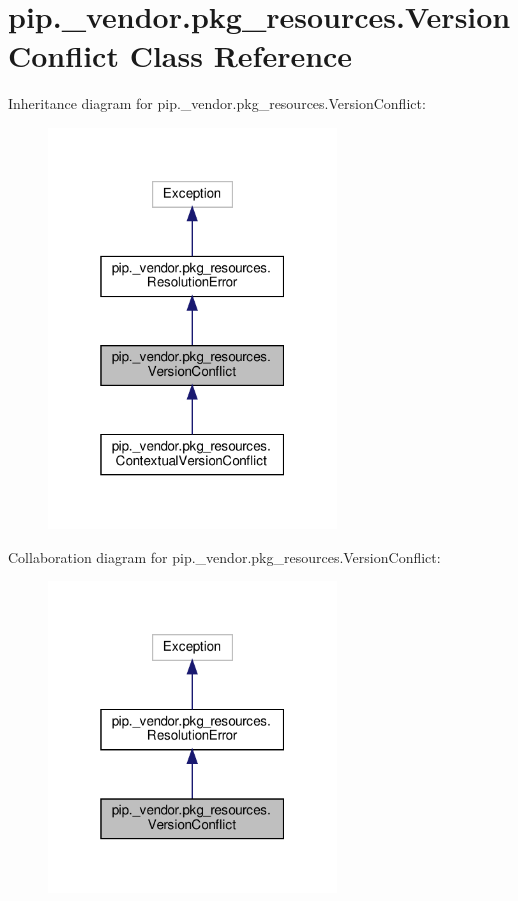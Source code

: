 \hypertarget{classpip_1_1__vendor_1_1pkg__resources_1_1VersionConflict}{}\section{pip.\+\_\+vendor.\+pkg\+\_\+resources.\+Version\+Conflict Class Reference}
\label{classpip_1_1__vendor_1_1pkg__resources_1_1VersionConflict}


Inheritance diagram for pip.\+\_\+vendor.\+pkg\+\_\+resources.\+Version\+Conflict\+:
\nopagebreak
\begin{figure}[H]
\begin{center}
\leavevmode
\includegraphics[width=217pt]{classpip_1_1__vendor_1_1pkg__resources_1_1VersionConflict__inherit__graph}
\end{center}
\end{figure}


Collaboration diagram for pip.\+\_\+vendor.\+pkg\+\_\+resources.\+Version\+Conflict\+:
\nopagebreak
\begin{figure}[H]
\begin{center}
\leavevmode
\includegraphics[width=217pt]{classpip_1_1__vendor_1_1pkg__resources_1_1VersionConflict__coll__graph}
\end{center}
\end{figure}
